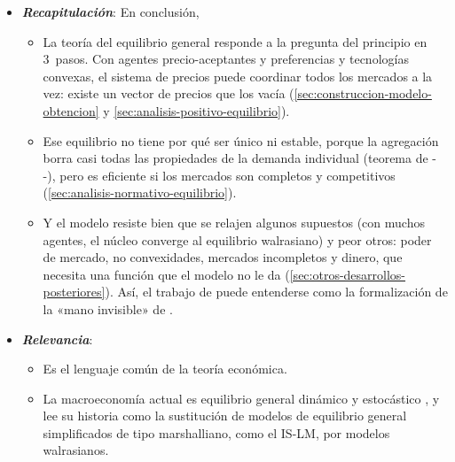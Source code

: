 \documentclass[11pt]{article}
\begin{document}
\begin{itemize}
\item \textbf{\emph{Recapitulación}}: En conclusión,
  \begin{itemize}
  \item La teoría del equilibrio general responde a la pregunta del principio en 3~pasos. Con agentes precio-aceptantes y preferencias y tecnologías convexas, el sistema de precios puede coordinar todos los mercados a la vez: existe un vector de precios que los vacía (\ref{sec:construccion-modelo-obtencion} y \ref{sec:analisis-positivo-equilibrio}).
  \item Ese equilibrio no tiene por qué ser único ni estable, porque la agregación borra casi todas las propiedades de la demanda individual (teorema de --), pero es eficiente si los mercados son completos y competitivos (\ref{sec:analisis-normativo-equilibrio}).
  \item Y el modelo resiste bien que se relajen algunos supuestos (con muchos agentes, el núcleo converge al equilibrio walrasiano) y peor otros: poder de mercado, no convexidades, mercados incompletos y dinero, que necesita una función que el modelo no le da (\ref{sec:otros-desarrollos-posteriores}). Así, el trabajo de  puede entenderse como la formalización de la «mano invisible» de .
  \end{itemize}
\item \textbf{\emph{Relevancia}}:
  \begin{itemize}
  \item Es el lenguaje común de la teoría económica.

  \item La macroeconomía actual es equilibrio general dinámico y estocástico  , y \textcite{DeVroey2004History} lee su historia como la sustitución de modelos de equilibrio general simplificados de tipo marshalliano, como el IS-LM, por modelos walrasianos.


\end{itemize}
\end{itemize}
\end{document}
